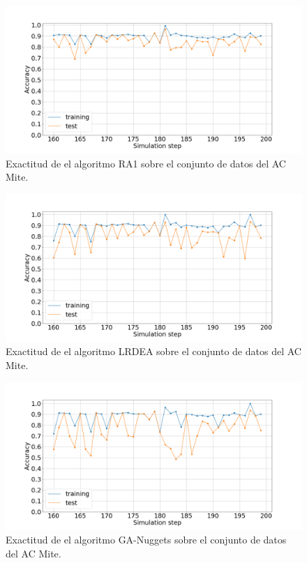 \begin{figure}[H]
	\centering
	\includegraphics[width=\linewidth]{fig/ra1_9}
	\caption{Exactitud de el algoritmo RA1 sobre el conjunto de datos del AC Mite.}
	\label{fig:ra1mite}
\end{figure}
\begin{figure}[H]
	\centering
	\includegraphics[width=\linewidth]{fig/LRDEA_10}
	\caption{Exactitud de el algoritmo LRDEA sobre el conjunto de datos del AC Mite.}
	\label{fig:lrdeamite}
\end{figure}

\begin{figure}[H]
	\centering
	\includegraphics[width=\linewidth]{fig/GA-nuggets_11}
	\caption{Exactitud de el algoritmo GA-Nuggets sobre el conjunto de datos del AC Mite.}
	\label{fig:ganuggetsmite}
\end{figure}